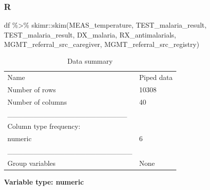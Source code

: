 \documentclass[
  letterpaper,
  DIV=11,
  numbers=noendperiod,
  oneside]{scrreprt}
\newenvironment{Shaded}{\begin{snugshade}}{\end{snugshade}}
\newcommand{\FunctionTok}[1]{\textcolor[rgb]{0.28,0.35,0.67}{#1}}
\newcommand{\NormalTok}[1]{\textcolor[rgb]{0.00,0.23,0.31}{#1}}
\newcommand{\SpecialCharTok}[1]{\textcolor[rgb]{0.37,0.37,0.37}{#1}}
\begin{document}
\hypertarget{r-8}{%
\subsubsection{R}\label{r-8}}

\begin{Shaded}
\begin{Highlighting}[]
\NormalTok{df }\SpecialCharTok{\%\textgreater{}\%}
\NormalTok{  skimr}\SpecialCharTok{::}\FunctionTok{skim}\NormalTok{(MEAS\_temperature,}
\NormalTok{              TEST\_malaria\_result,}
\NormalTok{              TEST\_malaria\_result,}
\NormalTok{              DX\_malaria,}
\NormalTok{              RX\_antimalarials,}
\NormalTok{              MGMT\_referral\_src\_caregiver,}
\NormalTok{              MGMT\_referral\_src\_registry)}
\end{Highlighting}
\end{Shaded}

\begin{longtable}[]{@{}ll@{}}
\caption{Data summary}\tabularnewline
\toprule()
\endhead
Name & Piped data \\
Number of rows & 10308 \\
Number of columns & 40 \\
\_\_\_\_\_\_\_\_\_\_\_\_\_\_\_\_\_\_\_\_\_\_\_ & \\
Column type frequency: & \\
numeric & 6 \\
\_\_\_\_\_\_\_\_\_\_\_\_\_\_\_\_\_\_\_\_\_\_\_\_ & \\
Group variables & None \\
\bottomrule()
\end{longtable}

\textbf{Variable type: numeric}
\end{document}
